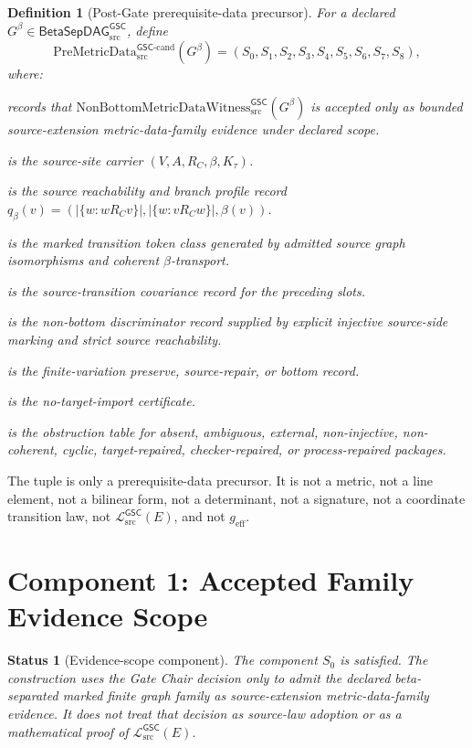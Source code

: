 \documentclass[11pt]{article}
\newcommand{\Witness}{\mathrm{NonBottomMetricDataWitness}_{\mathrm{src}}^{\mathsf{GSC}}}
\newcommand{\PreMetricData}{\mathrm{PreMetricData}_{\mathrm{src}}^{\mathsf{GSC}\mbox{-}\mathrm{cand}}}
\newcommand{\MetricData}{\mathcal{L}_{\mathrm{src}}^{\mathsf{GSC}}}
\newcommand{\BetaGraph}{\mathsf{BetaSepDAG}_{\mathrm{src}}^{\mathsf{GSC}}}
\newcommand{\Gbeta}{G^\beta}
\newcommand{\geff}{g_{\mathrm{eff}}}
\newtheorem{definition}{Definition}
\newtheorem{status}{Status}
\begin{document}
\begin{definition}[Post-Gate prerequisite-data precursor]
For a declared \(\Gbeta\in\BetaGraph\), define
\[
  \PreMetricData(\Gbeta)=(S_0,S_1,S_2,S_3,S_4,S_5,S_6,S_7,S_8),
\]
where:
\begin{description}[leftmargin=*]
  \item[\(S_0\)] records that \(\Witness(\Gbeta)\) is accepted only as bounded
  source-extension metric-data-family evidence under declared scope.
  \item[\(S_1\)] is the source-site carrier \((V,A,R_C,\beta,K_\tau)\).
  \item[\(S_2\)] is the source reachability and branch profile record
  \(q_\beta(v)=(|\{w:wR_Cv\}|,|\{w:vR_Cw\}|,\beta(v))\).
  \item[\(S_3\)] is the marked transition token class generated by admitted
  source graph isomorphisms and coherent \(\beta\)-transport.
  \item[\(S_4\)] is the source-transition covariance record for the preceding
  slots.
  \item[\(S_5\)] is the non-bottom discriminator record supplied by explicit
  injective source-side marking and strict source reachability.
  \item[\(S_6\)] is the finite-variation preserve, source-repair, or bottom
  record.
  \item[\(S_7\)] is the no-target-import certificate.
  \item[\(S_8\)] is the obstruction table for absent, ambiguous, external,
  non-injective, non-coherent, cyclic, target-repaired, checker-repaired, or
  process-repaired packages.
\end{description}
\end{definition}

The tuple is only a prerequisite-data precursor. It is not a metric, not a
line element, not a bilinear form, not a determinant, not a signature, not a
coordinate transition law, not \(\MetricData(E)\), and not \(\geff\).

\section{Component 1: Accepted Family Evidence Scope}

\begin{status}[Evidence-scope component]
The component \(S_0\) is satisfied. The construction uses the Gate Chair
decision only to admit the declared beta-separated marked finite graph family
as source-extension metric-data-family evidence. It does not treat that
decision as source-law adoption or as a mathematical proof of
\(\MetricData(E)\).
\end{status}
\end{document}
